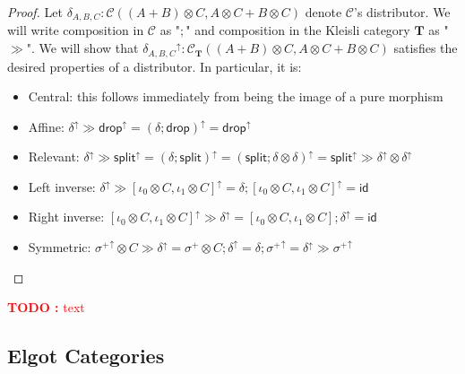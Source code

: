 \documentclass[acmsmall,screen,review]{acmart}
\newcounter{todos}
\newcommand{\TODO}[1]{{
  \stepcounter{todos}
  \begin{center}\large{\textcolor{red}{\textbf{TODO \arabic{todos}:} #1}}\end{center}
}}
\newcommand{\mc}[1]{\ensuremath{\mathcal{#1}}}
\newcommand{\mb}[1]{\ensuremath{\mathbf{#1}}}
\newcommand{\ms}[1]{\ensuremath{\mathsf{#1}}}
\newcommand{\upg}[2]{{#1}^{\uparrow #2}}
\begin{document}
\begin{proof}
  Let \(\delta_{A, B, C}: \mc{C}((A + B) \otimes C, A \otimes C + B \otimes C)\) denote \(\mc{C}\)'s distributor. We will write composition in \(\mc{C}\) as "\(;\)" and composition in the Kleisli category \(\mb{T}\) as "\(\gg\)".
  We will show that
  \(\upg{\delta_{A, B, C}}{}: \mc{C}_{\mb{T}}((A + B) \otimes C, A \otimes C + B \otimes C)\) satisfies the desired properties of a distributor. In particular, it is:
  \begin{itemize}
    \item Central: this follows immediately from being the image of a pure morphism
    \item Affine: \(\upg{\delta}{} \gg \upg{\ms{drop}}{} = \upg{(\delta;\ms{drop})}{} = \upg{\ms{drop}}{}\)
    \item Relevant: \(\upg{\delta}{} \gg \upg{\ms{split}}{} = \upg{(\delta;\ms{split})}{} = \upg{(\ms{split};\delta \otimes \delta)}{} = \upg{\ms{split}}{} \gg \upg{\delta}{} \otimes \upg{\delta}{}\)
    \item Left inverse: \(\upg{\delta}{} \gg \upg{[\iota_0 \otimes C, \iota_1 \otimes C]}{} = \upg{\delta;[\iota_0 \otimes C, \iota_1 \otimes C]}{} = \ms{id}\)
    \item Right inverse: \(\upg{[\iota_0 \otimes C, \iota_1 \otimes C]}{} \gg \upg{\delta}{} = \upg{[\iota_0 \otimes C, \iota_1 \otimes C];\delta}{} = \ms{id}\)
    \item Symmetric: \(\upg{\sigma^+}{} \otimes C \gg \upg{\delta}{} = \upg{\sigma^+ \otimes C;\delta}{} = \upg{\delta;\sigma^+}{} = \upg{\delta}{} \gg \upg{\sigma^+}{}\)
  \end{itemize}
\end{proof}

\TODO{text}

\subsection{Elgot Categories}
\end{document}
